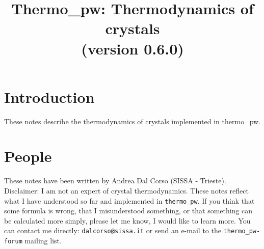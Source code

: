 \documentclass[12pt,a4paper]{article}
\def\version{0.6.0}
\def\tpw{{\sc thermo\_pw}}
\begin{document}
 
\author{}
\date{}


\title{
  \vskip 1cm
  {\color{red} \Huge Thermo\_pw: Thermodynamics of crystals} \\
  \Large (version \version)
}

\maketitle

\tableofcontents

\newpage

\section{{\color{coral}Introduction}}
These notes describe the thermodynamics of crystals implemented in \tpw. 

\section{\color{coral}People}
These notes have been written by Andrea Dal Corso (SISSA - Trieste). \\
Disclaimer: I am not an expert of crystal thermodynamics. 
These notes reflect what I have understood so far and implemented in 
\texttt{thermo\_pw}. If you think that some formula is wrong, 
that I misunderstood something, or that something can be calculated more 
simply, please let me know, I would like to learn more. 
You can contact me directly: \texttt{dalcorso@sissa.it} or send an
e-mail to the \texttt{thermo\_pw-forum} mailing list.
\end{document}
